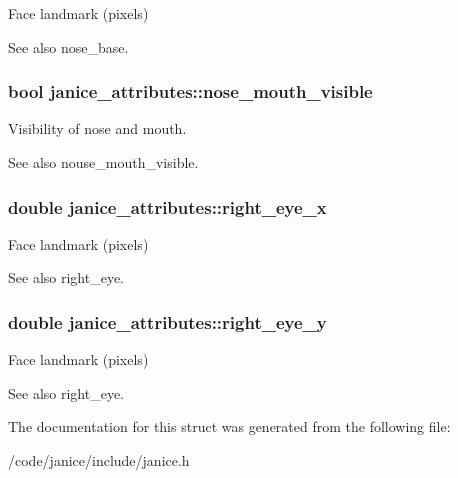 Face landmark (pixels) 

\begin{DoxySeeAlso}{See also}
nose\+\_\+base. 
\end{DoxySeeAlso}
\hypertarget{structjanice__attributes_a028b722cfc108c4f84a27b8f4423455d}{}
\subsubsection[{nose\+\_\+mouth\+\_\+visible}]{\setlength{\rightskip}{0pt plus 5cm}bool janice\+\_\+attributes\+::nose\+\_\+mouth\+\_\+visible}\label{structjanice__attributes_a028b722cfc108c4f84a27b8f4423455d}


Visibility of nose and mouth. 

\begin{DoxySeeAlso}{See also}
nouse\+\_\+mouth\+\_\+visible. 
\end{DoxySeeAlso}
\hypertarget{structjanice__attributes_aa768b24b50fec357c6b635cc2d8a6625}{}
\subsubsection[{right\+\_\+eye\+\_\+x}]{\setlength{\rightskip}{0pt plus 5cm}double janice\+\_\+attributes\+::right\+\_\+eye\+\_\+x}\label{structjanice__attributes_aa768b24b50fec357c6b635cc2d8a6625}


Face landmark (pixels) 

\begin{DoxySeeAlso}{See also}
right\+\_\+eye. 
\end{DoxySeeAlso}
\hypertarget{structjanice__attributes_a5c443fe811706febc4839fead8acecb6}{}
\subsubsection[{right\+\_\+eye\+\_\+y}]{\setlength{\rightskip}{0pt plus 5cm}double janice\+\_\+attributes\+::right\+\_\+eye\+\_\+y}\label{structjanice__attributes_a5c443fe811706febc4839fead8acecb6}


Face landmark (pixels) 

\begin{DoxySeeAlso}{See also}
right\+\_\+eye. 
\end{DoxySeeAlso}


The documentation for this struct was generated from the following file\+:\begin{DoxyCompactItemize}
\item 
/code/janice/include/janice.\+h\end{DoxyCompactItemize}
